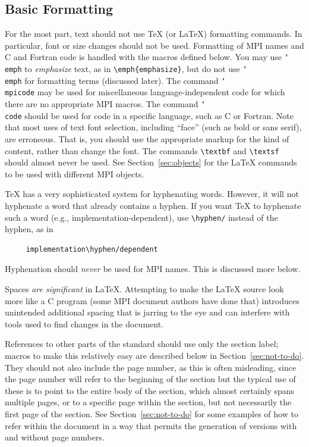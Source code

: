 \documentclass[letterpaper,twoside,11pt,fleqn]{article}
\def\cmd#1{\texttt{\char`\\#1}}
\def\MPI/{\textsf{MPI}}    %
\begin{document}
\subsection{Basic Formatting}

For the most part, text should not use TeX (or LaTeX) formatting
commands.  In particular, font or size changes should not be used.
Formatting of \MPI/ names and C and Fortran code is handled with the
macros defined below.  You may use \cmd{emph} to \emph{emphasize}
text, as in \verb+\emph{emphasize}+, but do not use \cmd{emph} for
formatting terms (discussed later).  The command \cmd{mpicode} may be
used for miscellaneous language-independent code for which there are
no appropriate \MPI/ macros.  The command \cmd{code} should be used
for code in a specific language, such as C or Fortran.
Note that most uses of text font selection, including
``face'' (such as bold or sans serif), are erroneous.  That is, you
should use the appropriate markup for the kind of content, rather than
change the font.  The commands \verb+\textbf+ and \verb+\textsf+
should almost never be used.  See Section~\ref{sec:objects} for the
LaTeX commands to be used with different \MPI/ objects.

TeX has a very sophisticated system for hyphenating words.
However, it will not hyphenate a word that already contains a hyphen.
If you want TeX to hyphenate such a word (e.g.,
implementation-dependent), use \verb+\hyphen/+ instead of the
hyphen, as in
\begin{verbatim}
     implementation\hyphen/dependent
\end{verbatim}
Hyphenation should \emph{never} be used for \MPI/ names.
This is discussed more below.

Spaces \emph{are significant} in LaTeX.  Attempting to make the LaTeX
source look more like a C program (some \MPI/ document authors have done
that) introduces unintended additional spacing that is jarring to the
eye and can
interfere with tools used to find changes in the document.

References to other parts of the standard should use only the section
label; macros to make this relatively easy are described below in
Section~\ref{sec:not-to-do}. They should not also include the page
number, as this is often misleading, since the
page number will refer to the beginning of the section but the typical
use of these is to point to the entire body of the section, which
almost certainly spans multiple pages, or to a specific page within
the section, but not necessarily the first page of the section.
See Section~\ref{sec:not-to-do} for some examples of how to refer
within the document in a way that permits the generation of versions
with and without page numbers.
\end{document}
